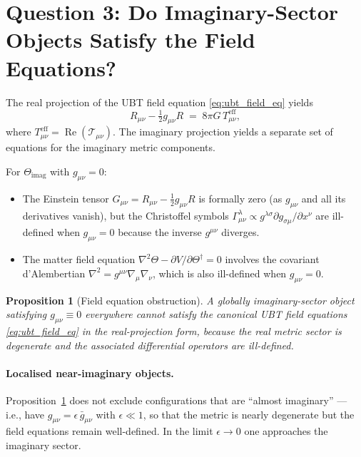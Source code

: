 \documentclass[12pt]{article}
\newtheorem{proposition}{Proposition}
\begin{document}
\section{Question 3: Do Imaginary-Sector Objects Satisfy the
Field Equations?}

The real projection of the UBT field equation \eqref{eq:ubt_field_eq}
yields
\begin{equation}
  R_{\mu\nu} - \tfrac{1}{2}g_{\mu\nu}R
  \;=\; 8\pi G\,T_{\mu\nu}^{\mathrm{eff}},
\end{equation}
where $T_{\mu\nu}^{\mathrm{eff}} = \operatorname{Re}(\mathcal{T}_{\mu\nu})$.
The imaginary projection yields a separate set of equations for the
imaginary metric components.

For $\Theta_\mathrm{imag}$ with $g_{\mu\nu} = 0$:
\begin{itemize}
  \item The Einstein tensor $G_{\mu\nu} = R_{\mu\nu} - \frac{1}{2}g_{\mu\nu}R$
    is formally zero (as $g_{\mu\nu}$ and all its derivatives vanish), but
    the Christoffel symbols $\Gamma^\lambda_{\mu\nu} \propto g^{\lambda\sigma}
    \partial g_{\sigma\mu}/\partial x^\nu$ are ill-defined when $g_{\mu\nu} = 0$
    because the inverse $g^{\mu\nu}$ diverges.
  \item The matter field equation $\nabla^2\Theta - \partial V/\partial\Theta^\dagger = 0$
    involves the covariant d'Alembertian $\nabla^2 = g^{\mu\nu}\nabla_\mu\nabla_\nu$,
    which is also ill-defined when $g_{\mu\nu} = 0$.
\end{itemize}

\begin{proposition}[Field equation obstruction]
\label{prop:obstruction}
A globally imaginary-sector object satisfying $g_{\mu\nu} \equiv 0$
everywhere cannot satisfy the canonical UBT field equations
\eqref{eq:ubt_field_eq} in the real-projection form, because the
real metric sector is degenerate and the associated differential
operators are ill-defined.
\end{proposition}

\paragraph{Localised near-imaginary objects.}
Proposition~\ref{prop:obstruction} does not exclude configurations
that are ``almost imaginary'' — i.e., have $g_{\mu\nu} = \epsilon\,
\bar{g}_{\mu\nu}$ with $\epsilon \ll 1$, so that the metric is
nearly degenerate but the field equations remain well-defined.  In
the limit $\epsilon \to 0$ one approaches the imaginary sector.
\end{document}
